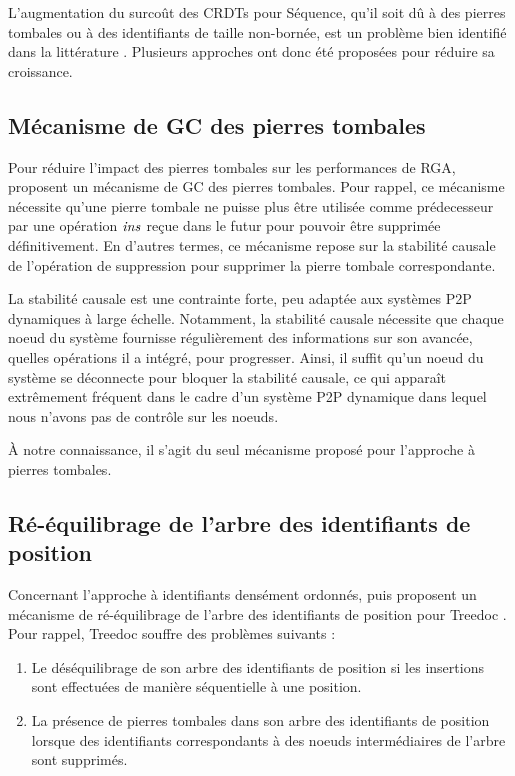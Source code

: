 L'augmentation du surcoût des \acp{CRDT} pour Séquence, qu'il soit dû à des pierres tombales ou à des identifiants de taille non-bornée, est un problème bien identifié dans la littérature \cite{ROH2011354,2009-treedoc-preguica,letia:hal-01248270,zawirski:hal-01248197,lseq2013,lseq2017}.
Plusieurs approches ont donc été proposées pour réduire sa croissance.

\subsection{Mécanisme de \ac{GC} des pierres tombales}

Pour réduire l'impact des pierres tombales sur les performances de \ac{RGA}, \textcite{ROH2011354} proposent un mécanisme de \ac{GC} des pierres tombales.
Pour rappel, ce mécanisme nécessite qu'une pierre tombale ne puisse plus être utilisée comme prédecesseur par une opération $\mathit{ins}$ reçue dans le futur pour pouvoir être supprimée définitivement.
En d'autres termes, ce mécanisme repose sur la stabilité causale de l'opération de suppression pour supprimer la pierre tombale correspondante.

La stabilité causale est une contrainte forte, peu adaptée aux systèmes \ac{P2P} dynamiques à large échelle.
Notamment, la stabilité causale nécessite que chaque noeud du système fournisse régulièrement des informations sur son avancée, \ie quelles opérations il a intégré, pour progresser.
Ainsi, il suffit qu'un noeud du système se déconnecte pour bloquer la stabilité causale, ce qui apparaît extrêmement fréquent dans le cadre d'un système \ac{P2P} dynamique dans lequel nous n'avons pas de contrôle sur les noeuds.

À notre connaissance, il s'agit du seul mécanisme proposé pour l'approche à pierres tombales.

\subsection{Ré-équilibrage de l'arbre des identifiants de position}

Concernant l'approche à identifiants densément ordonnés, \textcite{letia:hal-01248270} puis \textcite{zawirski:hal-01248197} proposent un mécanisme de ré-équilibrage de l'arbre des identifiants de position pour Treedoc \cite{2009-treedoc-preguica}.
Pour rappel, Treedoc souffre des problèmes suivants :
\begin{enumerate}
    \item Le déséquilibrage de son arbre des identifiants de position si les insertions sont effectuées de manière séquentielle à une position.
    \item La présence de pierres tombales dans son arbre des identifiants de position lorsque des identifiants correspondants à des noeuds intermédiaires de l'arbre sont supprimés.
\end{enumerate}

